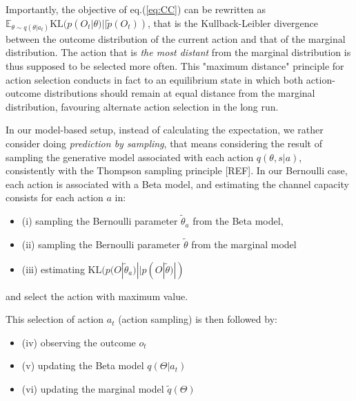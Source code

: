 \documentclass[10pt,letterpaper]{article}
\begin{document}
Importantly, the objective of eq.(\ref{eq:CC}) can be rewritten as $\mathbb{E}_{\theta\sim q(\theta|a_t)} \text{KL} ( p(O_t|\theta)|| \tilde{p}(O_t))$, that is the Kullback-Leibler divergence between the outcome distribution of the current action and that of the marginal distribution. The action that is \emph{the most distant} from the marginal distribution is thus supposed to be selected more often. This "maximum distance" principle for action selection conducts in fact to an equilibrium state in which both action-outcome distributions should remain at equal distance from the marginal distribution, favouring alternate action selection in the long run. 

In our model-based setup, instead of calculating the expectation, we rather consider doing \emph{prediction by sampling}, that means considering the result of sampling the generative model associated with each action $q(\theta,s|a)$, consistently with the Thompson sampling principle [REF].  
In our Bernoulli case,  each action is associated with a Beta model, and estimating the channel capacity consists for each action $a$ in:
\begin{itemize}
    \item (i) sampling the Bernoulli parameter $\tilde{\theta}_a$ from the Beta model,
    \item (ii) sampling the Bernoulli parameter $\tilde{\theta}$ from the marginal model
    \item (iii) estimating $\text{KL}(p(O|\tilde{\theta}_a)||p(O|\tilde{\theta})|)$
\end{itemize}   
and select the action with maximum value. 

This selection of action $a_t$ (action sampling) is then followed by:
\begin{itemize}
\item (iv) observing the outcome $o_t$
\item (v) updating the Beta model $q(\Theta|a_t)$
\item (vi) updating the marginal model $\tilde{q}(\Theta)$
\end{itemize}



\end{document}
